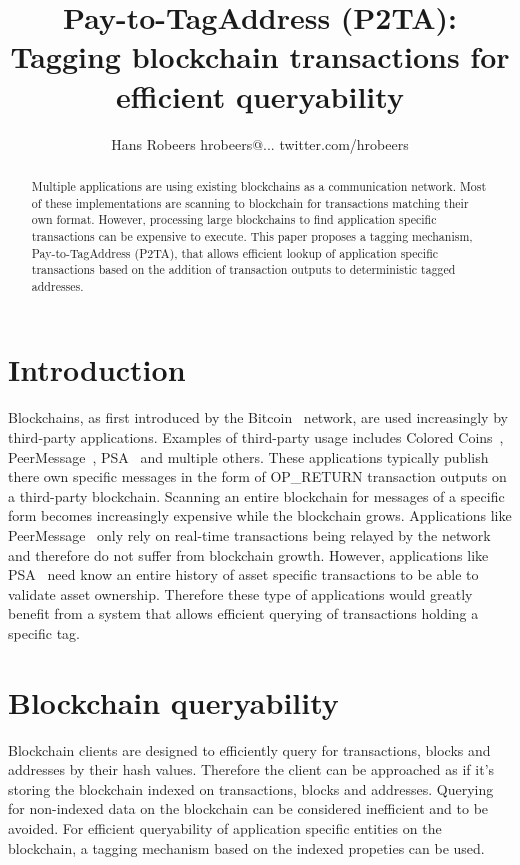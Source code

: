 \documentclass[a4paper,10pt]{article}
\title{Pay-to-TagAddress (P2TA): Tagging blockchain transactions for efficient queryability}
\author{Hans Robeers hrobeers@... twitter.com/hrobeers}
\begin{document}
\maketitle

\begin{abstract}
Multiple applications are using existing blockchains as a communication network.
Most of these implementations are scanning to blockchain for transactions matching their own format.
However, processing large blockchains to find application specific transactions can be expensive to execute.
This paper proposes a tagging mechanism, Pay-to-TagAddress (P2TA), that allows efficient lookup of application specific transactions based on the addition of transaction outputs to deterministic tagged addresses.
\end{abstract}

\section{Introduction}
Blockchains, as first introduced by the Bitcoin~\cite{Nak08} network, are used increasingly by third-party applications.
Examples of third-party usage includes Colored Coins~\cite{Ros12}, PeerMessage~\cite{Emeth}, PSA~\cite{Pchem} and multiple others.
These applications typically publish there own specific messages in the form of OP\_RETURN transaction outputs on a third-party blockchain.
Scanning an entire blockchain for messages of a specific form becomes increasingly expensive while the blockchain grows.
Applications like PeerMessage~\cite{Emeth} only rely on real-time transactions being relayed by the network and therefore do not suffer from blockchain growth.
However, applications like PSA~\cite{Pchem} need know an entire history of asset specific transactions to be able to validate asset ownership.
Therefore these type of applications would greatly benefit from a system that allows efficient querying of transactions holding a specific tag.

\section{Blockchain queryability}
Blockchain clients are designed to efficiently query for transactions, blocks and addresses by their hash values.
Therefore the client can be approached as if it's storing the blockchain indexed on transactions, blocks and addresses.
Querying for non-indexed data on the blockchain can be considered inefficient and to be avoided.
For efficient queryability of application specific entities on the blockchain, a tagging mechanism based on the indexed propeties can be used.
\end{document}
